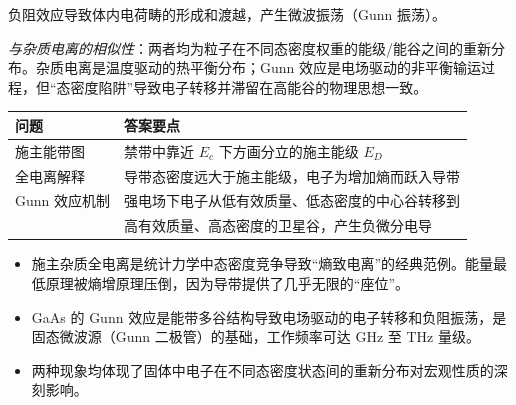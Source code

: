 \begin{derivationbox}[标准解题过程]
负阻效应导致体内电荷畴的形成和渡越，产生微波振荡（Gunn 振荡）。

\textit{与杂质电离的相似性}：两者均为粒子在不同态密度权重的能级/能谷之间的重新分布。杂质电离是温度驱动的热平衡分布；Gunn 效应是电场驱动的非平衡输运过程，但``态密度陷阱''导致电子转移并滞留在高能谷的物理思想一致。
\end{derivationbox}

\begin{formulabox}[答案汇总]
\begin{center}
\begin{tabular}{ll}
\toprule
\textbf{问题} & \textbf{答案要点} \\
\midrule
施主能带图 & 禁带中靠近 $E_c$ 下方画分立的施主能级 $E_D$ \\
全电离解释 & 导带态密度远大于施主能级，电子为增加熵而跃入导带 \\
Gunn 效应机制 & 强电场下电子从低有效质量、低态密度的中心谷转移到 \\ & 高有效质量、高态密度的卫星谷，产生负微分电导 \\
\bottomrule
\end{tabular}
\end{center}
\end{formulabox}

\begin{insightbox}[物理图像]
\begin{itemize}
    \item 施主杂质全电离是统计力学中态密度竞争导致``熵致电离''的经典范例。能量最低原理被熵增原理压倒，因为导带提供了几乎无限的``座位''。
    \item GaAs 的 Gunn 效应是能带多谷结构导致电场驱动的电子转移和负阻振荡，是固态微波源（Gunn 二极管）的基础，工作频率可达 GHz 至 THz 量级。
    \item 两种现象均体现了固体中电子在不同态密度状态间的重新分布对宏观性质的深刻影响。
\end{itemize}
\end{insightbox}
